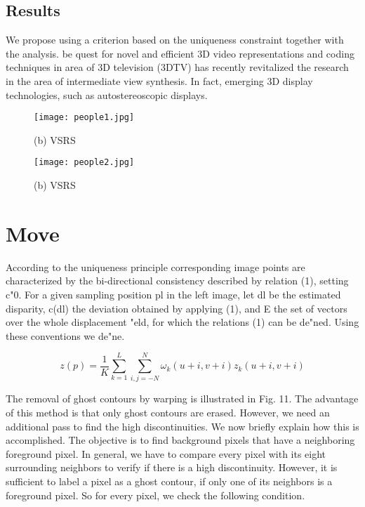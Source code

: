 \documentclass[fleqn,10pt]{a}
\begin{document}
\subsection{Results}

We propose using a criterion based on the uniqueness constraint together with the analysis.
be quest for novel and efficient 3D video representations and coding techniques in area of 3D television (3DTV) has recently revitalized the research in the area of intermediate view synthesis. In fact, emerging 3D display technologies, such as autostereoscopic displays.

\begin{figure}[ht]
\centering
\texttt{[image: people1.jpg]}
\caption{(b) VSRS}
\label{fig:view}
\end{figure}

\begin{figure}[ht]
\centering
\texttt{[image: people2.jpg]}
\caption{(b) VSRS}
\label{fig:view}
\end{figure}
\clearpage
\section{Move}

According to the uniqueness principle corresponding image points are characterized by the bi-directional consistency described by relation (1), setting c"0. For a given sampling position pl in the left image, let dl be the estimated disparity, c(dl) the deviation obtained by applying (1), and E the set of vectors over the whole displacement "eld, for which the relations (1) can be de"ned. Using these conventions we de"ne.

\begin{equation}
z(p)={\frac{1}{K}}\sum \limits _{k=1}^{L} \sum \limits _{i,j=-N}^{N} \omega_k(u+i,v+i)z_k(u+i,v+i)
\end{equation}

The removal of ghost contours by warping is illustrated in Fig. 11. The advantage of this method is that only ghost contours are erased. However, we need an additional pass to find the high discontinuities. We now briefly explain how this is accomplished. The objective is to find background pixels that have a neighboring foreground pixel. In general, we have to compare every pixel with its eight surrounding neighbors to verify if there is a high discontinuity. However, it is sufficient to label a pixel as a ghost contour, if only one of its neighbors is a foreground pixel. So for every pixel, we check the following condition.
\end{document}
